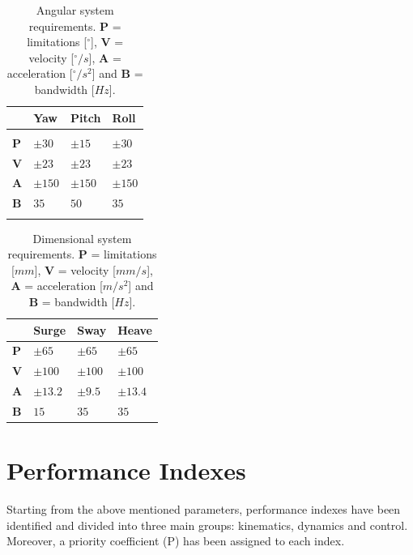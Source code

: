 \documentclass[10.5pt, twocolumn]{article}
\begin{document}
\begin{table}[h]
\centering
\begin{tabular}{C{0.5cm}C{1.3cm}C{1.3cm}C{1.3cm}}
	& \textbf{Yaw} & \textbf{Pitch} & \textbf{Roll} \\
	\hline
	\hline
	\\
	\textbf{P} & \( \pm 30 \) & \( \pm 15 \) & \( \pm 30 \) \\
	\textbf{V} & \( \pm 23 \) & \( \pm 23 \) & \( \pm 23 \) \\
	\textbf{A} & \( \pm 150 \) & \( \pm 150 \) & \( \pm 150 \) \\
	\textbf{B} & \( 35 \) & \( 50 \) & \( 35 \) \\
	\\
	\hline
\end{tabular}
\caption{Angular system requirements. \textbf{P} = limitations [\( ^\circ \)], \textbf{V} = velocity [\( ^\circ/s \)], \textbf{A} = acceleration [\( ^\circ/s^2 \)] and \textbf{B} = bandwidth [\( Hz \)].}
\label{t:SystemRequirements1}
\end{table}
\begin{table}[h]
\centering
\begin{tabular}{C{0.5cm}C{1.3cm}C{1.3cm}C{1.3cm}}
	& \textbf{Surge} & \textbf{Sway} & \textbf{Heave}\\
	\hline
	\hline
	\vspace{0.05cm}\textbf{P} & \vspace{0.05cm}\( \pm 65 \) & \vspace{0.05cm}\( \pm 65 \) & \vspace{0.05cm}\( \pm 65 \) \\
	\textbf{V} & \( \pm 100 \) & \( \pm 100 \) & \( \pm 100 \) \\
	\textbf{A} & \( \pm 13.2 \) & \( \pm 9.5 \) & \( \pm 13.4 \) \\
	\textbf{B} & \( 15 \) & \( 35 \) & \( 35 \)
	\vspace{0.15cm} \\
	\hline
\end{tabular}
\caption{Dimensional system requirements. \textbf{P} = limitations [\( mm \)], \textbf{V} = velocity [\( mm/s \)], \textbf{A} = acceleration [\( m/s^2 \)] and \textbf{B} = bandwidth [\( Hz \)].}
\label{t:SystemRequirements2}
\end{table}


\section{Performance Indexes}
Starting from the above mentioned parameters, performance indexes have been identified and divided into three main groups: kinematics, dynamics and control.
Moreover, a priority coefficient (P) has been assigned to each index.
\end{document}

